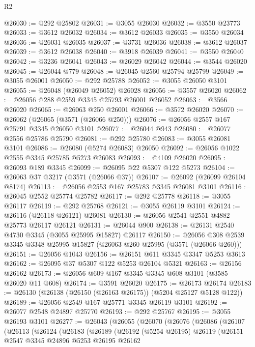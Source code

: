 \begin{lexlean}{R2}
\begin{coremodule}
@26030 := @292 @25802
@26031 := @3055 @26030
@26032 := @3550 @23773
@26033 := @3612 @26032
@26034 := @3612 @26033
@26035 := @3550 @26034
@26036 := @26031 @26035
@26037 := @3731 @26036
@26038 := @3612 @26037
@26039 := @3612 @26038
@26040 := @3918 @26039
@26041 := @3550 @26040
@26042 := @3236 @26041
@26043 := @26029 @26042
@26044 := @3544 @26020
@26045 := @26044 @779
@26048 := @26045 @2560 @25794 @25799
@26049 := @3055 @26001
@26050 := @292 @25788
@26052 := @3055 @26050 @3101
@26055 := @26048 (@26049 @26052) @26028
@26056 := @3557 @26020
@26062 := @26056 @288 @2559 @3345 @25793 @26001 @26052
@26063 := @3566 @26020
@26065 := @26063 @250 @26001
@26066 := @3572 @26020
@26070 := @26062 (@26065 (@3571 (@26066 @250)))
@26076 := @26056 @2557 @167 @25791 @3345 @26050 @3101
@26077 := @26044 @943
@26080 := @26077 @2556 @25786 @25790
@26081 := @292 @25780
@26083 := @3055 @26081 @3101
@26086 := @26080 (@5274 @26083) @26050
@26092 := @26056 @1022 @2555 @3345 @25785 @5273 @26083
@26093 := @4109 @26020
@26095 := @26093 @189 @3345
@26099 := @26095 @22 @5307 @122 @5273
@26104 := @26063 @37 @3217 (@3571 (@26066 @37))
@26107 := @26092 (@26099 @26104 @8174)
@26113 := @26056 @2553 @167 @25783 @3345 @26081 @3101
@26116 := @26045 @2552 @25774 @25782
@26117 := @292 @25778
@26118 := @3055 @26117
@26119 := @292 @25768
@26121 := @3055 @26119 @3101
@26124 := @26116 (@26118 @26121) @26081
@26130 := @26056 @2541 @2551 @4882 @25773 @26117 @26121
@26131 := @26044 @900
@26138 := @26131 @2540 @4730 @3345 (@3055 @25995 @15827) @26117
@26150 := @26056 @308 @2539 @3345 @3348 @25995 @15827 (@26063 @260 @25995 (@3571 (@26066 @260)))
@26151 := @26056 @1043
@26156 := @26151 @611 @3345 @3347 @5253 @3613
@26162 := @26095 @37 @5307 @122 @5253 @26104 @5321
@26163 := @26156 @26162
@26173 := @26056 @609 @167 @3345 @3345 @608 @3101 (@3585 @26020 @11 @608)
@26174 := @3591 @26020
@26175 := @26173 @26174
@26183 := @26130 (@26138 (@26150 (@26163 @26175)) (@5204 @25127 @5128 @122))
@26189 := @26056 @2549 @167 @25771 @3345 @26119 @3101
@26192 := @26077 @2548 @24897 @25770
@26193 := @292 @25767
@26195 := @3055 @26193 @3101
@26277 := @26043
    (@26055
      (@26070
        (@26076
          (@26086
            (@26107
              (@26113
                (@26124
                  (@26183
                    (@26189
                      (@26192
                        (@5254 @26195)
                        @26119
                        (@26151
                          @2547
                          @3345
                          @24896
                          @5253
                          @26195
                          @26162

\end{coremodule}
\end{lexlean}

